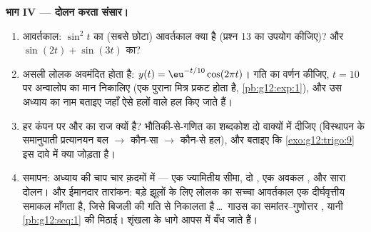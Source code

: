 \begin{problem}
\medskip
\noindent\textbf{भाग IV --- दोलन करता संसार।}
\begin{enumerate}[resume]
  \item आवर्तकाल: $\sin^2 t$ का (सबसे छोटा) आवर्तकाल क्या है (प्रश्न 13 का उपयोग
        कीजिए)? और $\sin(2t) + \sin(3t)$ का?
  \item असली लोलक अवमंदित होता है: $y(t) = \eu^{-t/10}\cos(2\pi t)$। गति का वर्णन कीजिए, $t = 10$ पर
        अन्वालोप का मान निकालिए (एक पुराना मित्र प्रकट होता है, \cref{pb:g12:exp:1}), और
        उस अध्याय का नाम बताइए जहाँ ऐसे हलों वाले  हल किए जाते हैं।
  \item हर कंपन पर  और  का राज क्यों है? भौतिकी-से-गणित का शब्दकोश
        दो वाक्यों में दीजिए (विस्थापन के समानुपाती प्रत्यानयन बल $\rightarrow$
        कौन-सा  $\rightarrow$ कौन-से हल), और बताइए कि \cref{exo:g12:trigo:9} इस दावे में क्या
        जोड़ता है।
  \item समापन: अध्याय की चाप चार क़दमों में --- एक ज्यामितीय सीमा, दो ,
        एक अवकल , और सारा दोलन। और ईमानदार तारांकन: बड़े झूलों के लिए
        लोलक का सच्चा आवर्तकाल एक दीर्घवृत्तीय समाकल माँगता है, जिसे बिजली
        की गति से निकालता है\,\dots\ गाउस का समांतर--गुणोत्तर , यानी
        \cref{pb:g12:seq:1} की मिठाई। शृंखला के धागे आपस में बँध जाते हैं।
\end{enumerate}
\end{problem}

